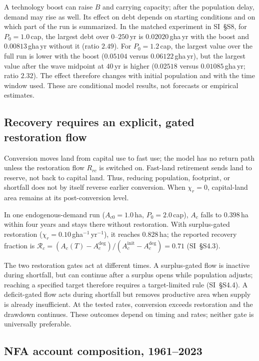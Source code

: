 \documentclass[preprint,12pt,authoryear]{elsarticle}
\begin{document}
A technology boost can raise $B$ and carrying capacity; after the population delay, demand may rise as well. Its effect on debt depends on starting conditions and on which part of the run is summarized. In the matched experiment in SI~\S S8, for $P_0=1.0$\,cap, the largest debt over $0$--$250$\,yr is $0.02020$\,gha\,yr with the boost and $0.00813$\,gha\,yr without it (ratio $2.49$). For $P_0=1.2$\,cap, the largest value over the full run is lower with the boost ($0.05104$ versus $0.06122$\,gha\,yr), but the largest value after the wave midpoint at $40$\,yr is higher ($0.02518$ versus $0.01085$\,gha\,yr; ratio $2.32$). The effect therefore changes with initial population and with the time window used. These are conditional model results, not forecasts or empirical estimates.

\subsection{Recovery requires an explicit, gated restoration flow}\label{sec:recovery}

Conversion moves land from capital use to fast use; the model has no return path unless the restoration flow $R_{rc}$ is switched on. Fast-land retirement sends land to reserve, not back to capital land. Thus, reducing population, footprint, or shortfall does not by itself reverse earlier conversion. When $\chi_r=0$, capital-land area remains at its post-conversion level.

In one endogenous-demand run ($A_{c0}=1.0$\,ha, $P_0=2.0$\,cap), $A_c$ falls to $0.398$\,ha within four years and stays there without restoration. With surplus-gated restoration ($\chi_r=0.10$\,gha$^{-1}$\,yr$^{-1}$), it reaches $0.828$\,ha; the reported recovery fraction is $\mathcal R_c=(A_c(T)-A_c^{\mathrm{deg}})/(A_c^{\mathrm{init}}-A_c^{\mathrm{deg}})=0.71$ (SI~\S S4.3).

The two restoration gates act at different times. A surplus-gated flow is inactive during shortfall, but can continue after a surplus opens while population adjusts; reaching a specified target therefore requires a target-limited rule (SI~\S S4.4). A deficit-gated flow acts during shortfall but removes productive area when supply is already insufficient. At the tested rates, conversion exceeds restoration and the drawdown continues. These outcomes depend on timing and rates; neither gate is universally preferable.

\subsection{NFA account composition, 1961--2023}\label{sec:empirical}
\end{document}
